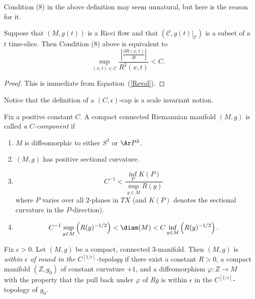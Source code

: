 Condition (8) in the above definition may seem unnatural, but here
is the reason for it.

\begin{claim}\label{claim:cap-condition-time-derivative-equivalence}
\label{partialtR}
Suppose that $(M,g(t))$ is a Ricci flow and that $\left({\mathcal
C},g(t)|_{\mathcal C}\right)$ is a subset of a $t$ time-slice. Then
Condition (8) above is equivalent to
$$\sup_{(x,t)\in {\mathcal C}}\frac{\left|\frac{\partial R(x,t)}{\partial
t}\right|}{R^2(x,t)}<C.$$
\end{claim}

\begin{proof}
This is immediate from Equation~(\ref{Revol}).
\end{proof}


Notice that the definition of a $(C,\epsilon)$-cap is a scale
invariant notion.

\begin{definition}[$C$-component]\label{def:c-component}
\label{Ccomponent}
Fix a positive constant $C$. A compact connected Riemannian manifold
$(M,g)$ is called {\em a $C$-component} if
\begin{enumerate}
\item[(1)] $M$ is diffeomorphic to either $S^3$ or $\Ar P^3$.
\item[(2)] $(M,g)$ has positive sectional curvature.
\item[(3)] $$C^{-1}<\frac{\inf_{P}K(P)}{\sup_{y\in M}R(y)}$$
where $P$ varies over all $2$-planes in $TX$ (and $K(P)$ denotes the
sectional curvature in the $P$-direction).
\item[(4)] $$C^{-1}\sup_{y\in M}\left(R(y)^{-1/2}\right)<\diam(M)<C\inf_{y\in M}\left(R(y)^{-1/2}\right).$$
\end{enumerate}
\end{definition}


\begin{definition}\label{def:epsilon-round-component}
\label{defnepsround}
Fix $\epsilon>0$. Let $(M,g)$ be a compact, connected $3$-manifold.
Then $(M,g)$ is {\em within $\epsilon$ of round in the
$C^{[1/\epsilon]}$-topology} if there exist a constant $R>0$, a
compact manifold $(Z,g_0)$ of constant curvature $+1$, and a
diffeomorphism $\varphi\colon Z\to M$ with the property that the
pull back under $\varphi$ of $Rg$ is within $\epsilon$ in the
$C^{[1/\epsilon]}$-topology of $g_0$.
\end{definition}



